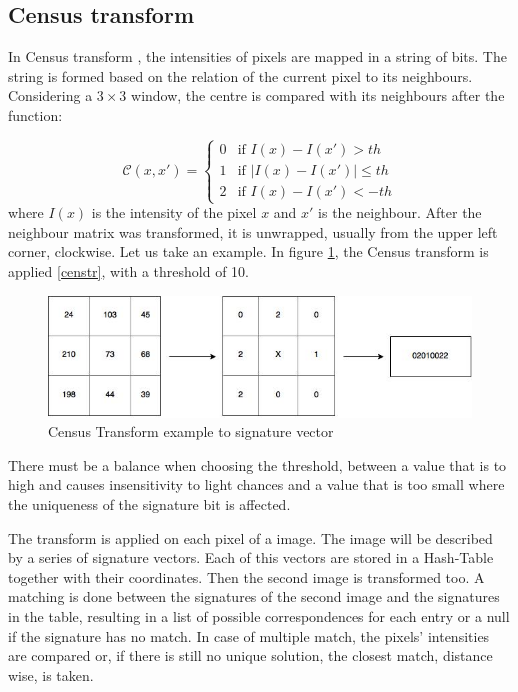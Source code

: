 \documentclass[12pt,a4paper,twoside]{report}
\begin{document}
{\subsection{Census transform}

In Census transform \cite{stein2004efficient}, the intensities of pixels are mapped in a string of bits. The string is formed based on the relation of the current pixel to its neighbours.  Considering a $3\times3$ window, the centre is compared with its neighbours after the function:

\begin{equation} \label{censtr}
\mathcal{C}(x,x') =
\left\{
\begin{array}{ll}
0  & \mbox{if } I(x) - I(x') > th \\
1  & \mbox{if } |I(x) - I(x')| \leq th  \\
2 & \mbox{if } I(x) - I(x') <- th 
\end{array}
\right.
\end{equation}
where $I(x)$ is the intensity of the pixel $x$ and $x'$ is the neighbour. After the neighbour matrix was transformed, it is unwrapped, usually from the upper left corner, clockwise. Let us take an example. In figure \ref{cens}, the Census transform is applied \ref{censtr}, with a threshold of 10.

\begin{figure} \label{cens}
	\centering
	\includegraphics[width = 5in]{img/cens} 
	\caption{ Census Transform example to signature vector }
\end{figure}


There must be a balance when choosing the threshold, between a value that is to high and causes insensitivity to light chances and a value that is too small where the uniqueness of the signature bit is affected.

The transform is applied on each pixel of a image. The image will be described by a series of signature vectors. Each of this vectors are stored in a Hash-Table together with their coordinates.
Then the second image is transformed too. A matching is done between the signatures of the second image and the signatures in the table, resulting in a list of possible correspondences for each entry or a null if the signature has no match. In case of multiple match, the pixels' intensities are compared or, if there is still no unique solution, the closest match, distance wise, is taken.


}
\end{document}
